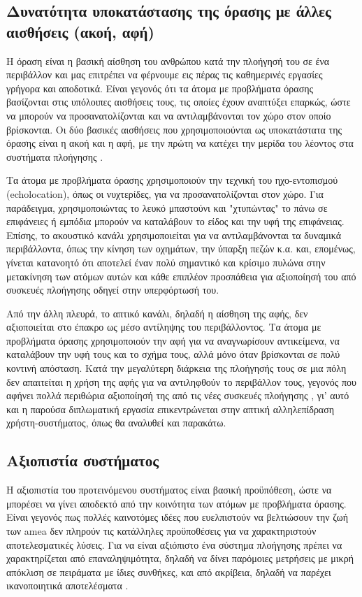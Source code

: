 \subsection{Δυνατότητα υποκατάστασης της όρασης με άλλες αισθήσεις (ακοή, αφή)}
Η όραση είναι η βασική αίσθηση του ανθρώπου κατά την πλοήγησή του σε ένα περιβάλλον και μας επιτρέπει να φέρνουμε εις πέρας τις καθημερινές εργασίες γρήγορα και αποδοτικά. Είναι γεγονός ότι τα άτομα με προβλήματα όρασης βασίζονται στις υπόλοιπες αισθήσεις τους, τις οποίες έχουν αναπτύξει επαρκώς, ώστε να μπορούν να προσανατολίζονται και να αντιλαμβάνονται τον χώρο στον οποίο βρίσκονται. Οι δύο βασικές αισθήσεις που χρησιμοποιούνται ως υποκατάστατα της όρασης είναι η ακοή και η αφή, με την πρώτη να κατέχει την μερίδα του λέοντος στα συστήματα πλοήγησης \cite{na2012sensory}.

Τα άτομα με προβλήματα όρασης χρησιμοποιούν την τεχνική του ηχο-εντοπισμού (echolocation), όπως οι νυχτερίδες, για να προσανατολίζονται στον χώρο. Για παράδειγμα, χρησιμοποιώντας το λευκό μπαστούνι και "χτυπώντας" το πάνω σε επιφάνειες ή εμπόδια μπορούν να καταλάβουν το είδος και την υφή της επιφάνειας. Επίσης, το ακουστικό κανάλι χρησιμοποιείται για να αντιλαμβάνονται τα δυναμικά περιβάλλοντα, όπως την κίνηση των οχημάτων, την ύπαρξη πεζών κ.α. και, επομένως, γίνεται κατανοητό ότι αποτελεί έναν πολύ σημαντικό και κρίσιμο πυλώνα στην μετακίνηση των ατόμων αυτών και κάθε επιπλέον προσπάθεια για αξιοποίησή του από συσκευές πλοήγησης οδηγεί στην υπερφόρτωσή του.

Από την άλλη πλευρά, το απτικό κανάλι, δηλαδή η αίσθηση της αφής, δεν αξιοποιείται στο έπακρο ως μέσο αντίληψης του περιβάλλοντος. Τα άτομα με προβλήματα όρασης χρησιμοποιούν την αφή για να αναγνωρίσουν αντικείμενα, να καταλάβουν την υφή τους και το σχήμα τους, αλλά μόνο όταν βρίσκονται σε πολύ κοντινή απόσταση. Κατά την μεγαλύτερη διάρκεια της πλοήγησής τους σε μια πόλη δεν απαιτείται η χρήση της αφής για να αντιληφθούν το περιβάλλον τους, γεγονός που αφήνει πολλά περιθώρια αξιοποίησή της από τις νέες συσκευές πλοήγησης \cite{billah2019sensory}, γι' αυτό και η παρούσα διπλωματική εργασία επικεντρώνεται στην απτική αλληλεπίδραση χρήστη-συστήματος, όπως θα αναλυθεί και παρακάτω.

\subsection{Αξιοπιστία συστήματος}
Η αξιοπιστία του προτεινόμενου συστήματος είναι βασική προϋπόθεση, ώστε να μπορέσει να γίνει αποδεκτό από την κοινότητα των ατόμων με προβλήματα όρασης. Είναι γεγονός πως πολλές καινοτόμες ιδέες που ευελπιστούν να βελτιώσουν την ζωή των \acrshort{amea} δεν πληρούν τις κατάλληλες προϋποθέσεις για να χαρακτηριστούν αποτελεσματικές λύσεις. Για να είναι αξιόπιστο ένα σύστημα πλοήγησης πρέπει να χαρακτηρίζεται από επαναληψιμότητα, δηλαδή να δίνει παρόμοιες μετρήσεις με μικρή απόκλιση σε πειράματα με ίδιες συνθήκες, και από ακρίβεια, δηλαδή να παρέχει ικανοποιητικά αποτελέσματα \cite{bruton2000reliability}.

